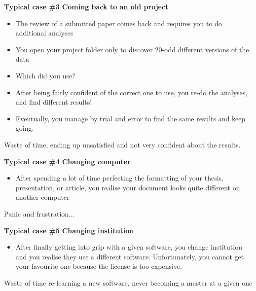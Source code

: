 \documentclass[9pt,xcolor=pdftex,dvipsnames,table]{beamer}
\begin{document}
\begin{frame}{\textbf{Typical case \#3}}
\textbf{Coming back to an old project}
\begin{itemize}
\item The review of a submitted paper comes back and requires you to
  do additional analyses
\item You open your project folder only to discover 20-odd different
  versions of the data
\item Which did you use?
\item After being fairly confident of the correct one to use, you
  re-do the analyses, and find different results!
\item Eventually, you manage by trial and error to find the same
  results and keep going.
\end{itemize}
\vspace{0.6cm}
Waste of time, ending up unsatisfied and not very confident about the results.
\vspace{-0.5cm}
\end{frame}


\begin{frame}{\textbf{Typical case \#4}}
\textbf{Changing computer}
\begin{itemize}
\item After spending a lot of time perfecting the formatting of your
  thesis, presentation, or article, you realise your document looks
  quite different on another computer
\end{itemize}
\vspace{0.6cm}
Panic and frustration...
\vspace{-0.5cm}
\end{frame}


\begin{frame}{\textbf{Typical case \#5}}
\textbf{Changing institution}
\begin{itemize}
\item After finally getting into grip with a given software, you
  change institution and you realise they use a different
  software. Unfortunately, you cannot get your favourite one because
  the license is too expensive.
\end{itemize}
\vspace{0.6cm}
Waste of time re-learning a new software, never becoming a master at a
given one
\vspace{-0.5cm}
\end{frame}
\end{document}
